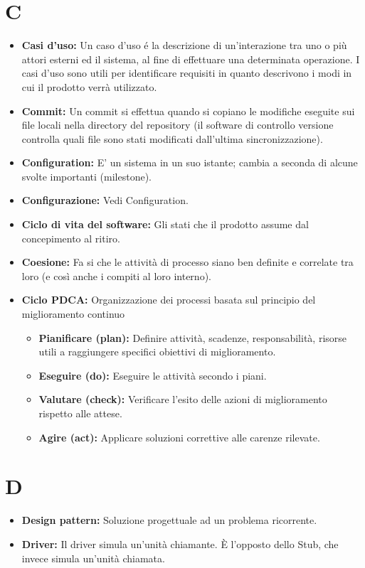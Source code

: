 \documentclass[a4paper]{article}
\begin{document}
	\section*{C}
		\begin{itemize}
			\item \textbf{Casi d'uso:} Un caso d'uso é la descrizione di un'interazione tra uno o più attori esterni ed il sistema, al
			fine di effettuare una determinata operazione. I casi d'uso sono utili per identificare requisiti in quanto descrivono
			i modi in cui il prodotto verrà utilizzato.
			\item \textbf{Commit:} Un commit si effettua quando si copiano le modifiche eseguite sui file locali nella directory del 
			repository  (il software di controllo versione controlla quali file sono stati modificati dall’ultima sincronizzazione).
			\item \textbf{Configuration:} E' un sistema in un suo istante; cambia a seconda di alcune svolte importanti (milestone).
			\item \textbf{Configurazione:} Vedi Configuration.
			\item \textbf{Ciclo di vita del software:} Gli stati che il prodotto assume dal concepimento al ritiro.
			\item \textbf{Coesione:} Fa si che le attività di processo siano ben definite e correlate tra loro (e così anche i 
			compiti al loro interno).
			\item \textbf{Ciclo PDCA:} Organizzazione dei processi basata sul principio del miglioramento continuo
			\begin{itemize}
				\item \textbf{Pianificare (plan):} Definire attività, scadenze, responsabilità, risorse utili a raggiungere 
				specifici obiettivi di miglioramento.
				\item \textbf{Eseguire (do):} Eseguire le attività secondo i piani.
				\item \textbf{Valutare (check):} Verificare l’esito delle azioni di miglioramento rispetto alle attese.
				\item \textbf{Agire (act):} Applicare soluzioni correttive alle carenze rilevate.
			\end{itemize}
		\end{itemize}
		
	\section*{D}
		\begin{itemize}
			\item \textbf{Design pattern:} Soluzione progettuale ad un problema ricorrente. 
			\item \textbf{Driver:} Il driver simula un'unità chiamante. È l'opposto dello Stub, che invece simula un'unità chiamata.
		\end{itemize}
\end{document}
